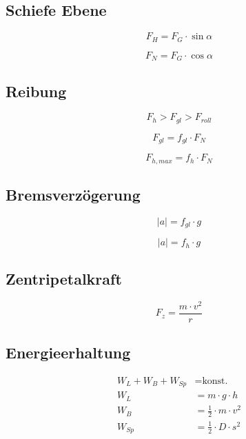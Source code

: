 \subsection{Schiefe Ebene}
\begin{equation}\label{eq:mechanik:schiefe:ebene:hangabtriebskraft}
 F_H = F_G \cdot \sin \alpha
\end{equation}

\begin{equation}\label{eq:mechanik:schiefe:ebene:normalkraft}
 F_N = F_G \cdot \cos \alpha
\end{equation}

\subsection{Reibung}
\begin{equation}\label{eq:mechanik:reibung:ordnung}
 F_h > F_{gl} > F_{roll}
\end{equation}

\begin{equation}\label{eq:mechanik:gleitreibung:kraft}
 F_{gl} = f_{gl} \cdot F_N 
\end{equation}

\begin{equation}\label{eq:mechanik:haftreibung:maximale:kraft}
 F_{h,max} = f_{h} \cdot F_N 
\end{equation}

\subsection{Bremsverzögerung}
\begin{equation}\label{eq:mechanik:gleitreibung:bremsverzoegerung}
 \left| a \right| = f_{gl} \cdot g
\end{equation}

\begin{equation}\label{eq:mechanik:haftreibung:bremsverzoegerung}
 \left| a \right| = f_{h} \cdot g
\end{equation}

\subsection{Zentripetalkraft}
\begin{equation}\label{eq:mechanik:zentripetalkraft}
 F_z = \frac{m \cdot v^2}{r}
\end{equation}

\subsection{Energieerhaltung}
\begin{align}
\label{eq:mechanik:energieerhaltung}
 W_L + W_B + W_{Sp}  &= \text{konst.}\\
\label{eq:mechanik:lageenergie}
 W_L  &= m \cdot g \cdot h \\
\label{eq:mechanik:bewegungsenergie}
 W_B &= \frac{1}{2}\cdot m \cdot v^2 \\
\label{eq:mechanik:spannenergie}
W_{Sp} &=  \frac{1}{2} \cdot D \cdot s^2
\end{align}

